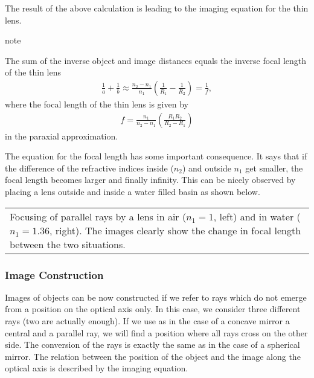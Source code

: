 \documentclass[letterpaper,10pt,english]{sphinxmanual}
\begin{document}
The result of the above calculation is leading to the imaging equation for the thin lens.

\begin{sphinxadmonition}{note}{}\unskip
{}

The sum of the inverse object and image distances equals the inverse focal length of the thin lens
\begin{equation*}
\begin{split}\frac{1}{a}+\frac{1}{b}\approx\frac{n_2-n_1}{n_1}\left (\frac{1}{R_1}-\frac{1}{R_2}\right )=\frac{1}{f},\end{split}
\end{equation*}
where the focal length of the thin lens is given by
\begin{equation*}
\begin{split}f=\frac{n_1}{n_2-n_1}\left ( \frac{R_1 R_2}{R_2 -R_1}\right)\end{split}
\end{equation*}
in the paraxial approximation.
\end{sphinxadmonition}

The equation for the focal length has some important consequence. It says that if the difference of the refractive indices inside (\(n_2\)) and outside \(n_1\) get smaller, the focal length becomes larger and finally infinity. This can be nicely observed by placing a lens outside and inside a water filled basin as shown below.


\begin{savenotes}\sphinxattablestart
\centering
\begin{tabulary}{\linewidth}[t]{|T|}
\hline
\sphinxstyletheadfamily 
{} 
\\
\hline
{} Focusing of parallel rays by a lens in air (\(n_1=1\), left) and in water (\(n_1=1.36\), right). The images clearly show the change in focal length between the two situations.
\\
\hline
\end{tabulary}
\par
\sphinxattableend\end{savenotes}


\subsubsection{Image Construction}
\label{\detokenize{notebooks/L3/Optical Elements:Image-Construction}}
Images of objects can be now constructed if we refer to rays which do not emerge from a position on the optical axis only. In this case, we consider three different rays (two are actually enough). If we use as in the case of a concave mirror a central and a parallel ray, we will find a position where all rays cross on the other side. The conversion of the rays is exactly the same as in the case of a spherical mirror. The relation between the position of the object and the image along the optical
axis is described by the imaging equation.
\end{document}

